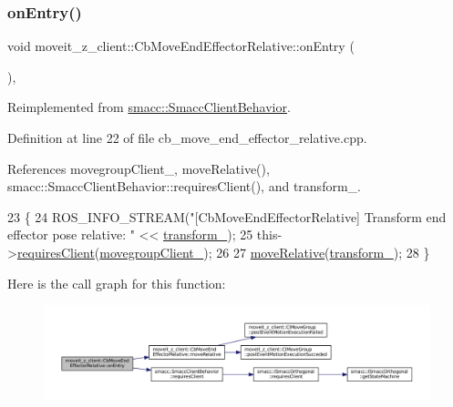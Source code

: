 \subsubsection{\texorpdfstring{on\+Entry()}{onEntry()}}
{\footnotesize\ttfamily void moveit\+\_\+z\+\_\+client\+::\+Cb\+Move\+End\+Effector\+Relative\+::on\+Entry (\begin{DoxyParamCaption}{ }\end{DoxyParamCaption})\hspace{0.3cm}{\ttfamily [override]}, {\ttfamily [virtual]}}



Reimplemented from \hyperlink{classsmacc_1_1SmaccClientBehavior_a7962382f93987c720ad432fef55b123f}{smacc\+::\+Smacc\+Client\+Behavior}.



Definition at line 22 of file cb\+\_\+move\+\_\+end\+\_\+effector\+\_\+relative.\+cpp.



References movegroup\+Client\+\_\+, move\+Relative(), smacc\+::\+Smacc\+Client\+Behavior\+::requires\+Client(), and transform\+\_\+.


\begin{DoxyCode}
23 \{
24     ROS\_INFO\_STREAM(\textcolor{stringliteral}{"[CbMoveEndEffectorRelative] Transform end effector pose relative: "} << 
      \hyperlink{classmoveit__z__client_1_1CbMoveEndEffectorRelative_a0686340d0328df4d0ecb962b61026f43}{transform\_});
25     this->\hyperlink{classsmacc_1_1SmaccClientBehavior_a917f001e763a1059af337bf4e164f542}{requiresClient}(\hyperlink{classmoveit__z__client_1_1CbMoveEndEffectorRelative_a5f009b3baaaa47ad3be09d43bab33c07}{movegroupClient\_});
26     
27     \hyperlink{classmoveit__z__client_1_1CbMoveEndEffectorRelative_a998f25ebcd702eaa211ba7ee9209914d}{moveRelative}(\hyperlink{classmoveit__z__client_1_1CbMoveEndEffectorRelative_a0686340d0328df4d0ecb962b61026f43}{transform\_});
28 \}
\end{DoxyCode}
Here is the call graph for this function\+:
\nopagebreak
\begin{figure}[H]
\begin{center}
\leavevmode
\includegraphics[width=350pt]{classmoveit__z__client_1_1CbMoveEndEffectorRelative_ae425a51d23933a13a87df9cd26f0fc99_cgraph}
\end{center}
\end{figure}
\mbox{\label{classmoveit__z__client_1_1CbMoveEndEffectorRelative_af23c69f0919a2f62fbddf0e1dbdb83e1}} 
